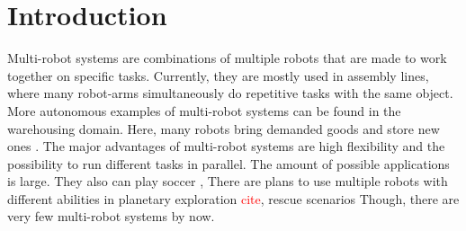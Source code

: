 \section{Introduction}

Multi-robot systems are combinations of multiple robots that are made to work together on specific tasks. Currently, they are mostly used in assembly lines, where many robot-arms simultaneously do repetitive tasks with the same object. More autonomous examples of multi-robot systems can be found in the warehousing domain. Here, many robots bring demanded goods and store new ones \cite{Kiva}. The major advantages of multi-robot systems are high flexibility and the possibility to run different tasks in parallel. The amount of possible applications is large. They also can play soccer \cite{mas_soccer}, There are plans to use multiple robots with different abilities in planetary exploration \textcolor{red}{cite}, rescue scenarios \cite{mas_rescue}
Though, there are very few multi-robot systems by now.
